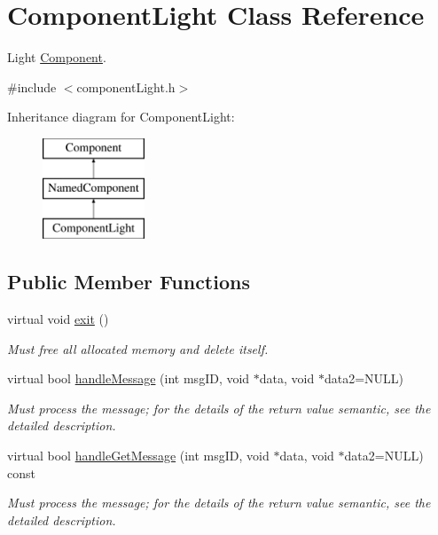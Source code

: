 \hypertarget{classComponentLight}{
\section{\-Component\-Light \-Class \-Reference}
\label{d1/daa/classComponentLight}
}


\-Light \hyperlink{classComponent}{\-Component}.  




{\ttfamily \#include $<$component\-Light.\-h$>$}

\-Inheritance diagram for \-Component\-Light\-:\begin{figure}[H]
\begin{center}
\leavevmode
\includegraphics[height=3.000000cm]{d1/daa/classComponentLight}
\end{center}
\end{figure}
\subsection*{\-Public \-Member \-Functions}
\begin{DoxyCompactItemize}
\item 
\hypertarget{classComponentLight_ac1a452429644772aa159d6fb7b9168d3}{
virtual void \hyperlink{classComponentLight_ac1a452429644772aa159d6fb7b9168d3}{exit} ()}
\label{d1/daa/classComponentLight_ac1a452429644772aa159d6fb7b9168d3}

\begin{DoxyCompactList}\small\item\em \-Must free all allocated memory and delete itself. \end{DoxyCompactList}\item 
virtual bool \hyperlink{classComponentLight_a7782881c1c2c38287c6f3d9d53eb8acf}{handle\-Message} (int msg\-I\-D, void $\ast$data, void $\ast$data2=\-N\-U\-L\-L)
\begin{DoxyCompactList}\small\item\em \-Must process the message; for the details of the return value semantic, see the detailed description. \end{DoxyCompactList}\item 
virtual bool \hyperlink{classComponentLight_a0510cdf9e4488e0ac07c262d8b02544d}{handle\-Get\-Message} (int msg\-I\-D, void $\ast$data, void $\ast$data2=\-N\-U\-L\-L) const 
\begin{DoxyCompactList}\small\item\em \-Must process the message; for the details of the return value semantic, see the detailed description. \end{DoxyCompactList}\end{DoxyCompactItemize}
